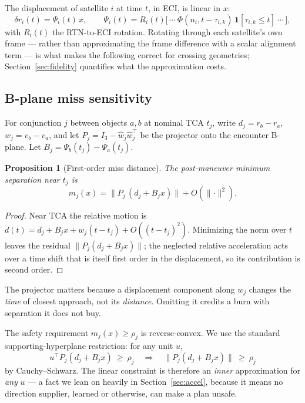 \documentclass[11pt]{article}
\newtheorem{proposition}{Proposition}
\theoremstyle{definition}
\theoremstyle{remark}
\newcommand{\norm}[1]{\lVert #1 \rVert}
\begin{document}
The displacement of satellite $i$ at time $t$, in ECI, is linear in $x$:
\begin{equation}
\delta r_i(t) = \Psi_i(t)\,x,
\qquad
\Psi_i(t) = R_i(t)\big[\,\cdots\ \Phi(n_i, t-\tau_{i,k})\,\mathbf{1}[\tau_{i,k}\le t]\ \cdots\,\big],
\end{equation}
with $R_i(t)$ the RTN-to-ECI rotation. Rotating through each satellite's own
frame --- rather than approximating the frame difference with a scalar
alignment term --- is what makes the following correct for crossing geometries;
Section~\ref{sec:fidelity} quantifies what the approximation costs.

\subsection{B-plane miss sensitivity}

For conjunction $j$ between objects $a,b$ at nominal TCA $t_j$, write
$d_j = r_b - r_a$, $w_j = v_b - v_a$, and let
$P_j = I_3 - \hat w_j \hat w_j^{\!\top}$ be the projector onto the encounter
B-plane. Let $B_j = \Psi_b(t_j) - \Psi_a(t_j)$.

\begin{proposition}[First-order miss distance]
\label{prop:miss}
The post-maneuver minimum separation near $t_j$ is
\begin{equation}
m_j(x) = \norm{P_j\,(d_j + B_j x)} + O(\norm{\cdot}^2).
\end{equation}
\end{proposition}

\begin{proof}
Near TCA the relative motion is $d(t) = d_j + B_j x + w_j (t-t_j) + O((t-t_j)^2)$.
Minimizing the norm over $t$ leaves the residual $\norm{P_j(d_j + B_jx)}$; the
neglected relative acceleration acts over a time shift that is itself first
order in the displacement, so its contribution is second order.
\end{proof}

The projector matters because a displacement component along $w_j$ changes the
\emph{time} of closest approach, not its \emph{distance}. Omitting it credits a
burn with separation it does not buy.

The safety requirement $m_j(x) \ge \rho_j$ is reverse-convex. We use the
standard supporting-hyperplane restriction: for any unit $u$,
\begin{equation}
u^{\!\top} P_j (d_j + B_j x) \ \ge\ \rho_j
\quad\Longrightarrow\quad
\norm{P_j(d_j + B_j x)} \ \ge\ \rho_j
\label{eq:restriction}
\end{equation}
by Cauchy--Schwarz. The linear constraint is therefore an \emph{inner}
approximation for \emph{any} $u$ --- a fact we lean on heavily in
Section~\ref{sec:accel}, because it means no direction supplier, learned or
otherwise, can make a plan unsafe.
\end{document}
